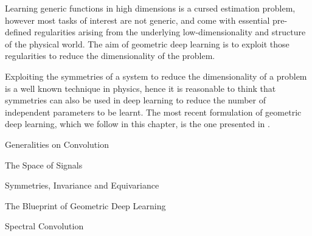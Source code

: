 \documentclass[../main.tex]{subfiles}
\begin{document}
    Learning generic functions in high dimensions is a cursed estimation
    problem, however most tasks of interest are not generic, and come with essential
    pre-defined regularities arising from the underlying low-dimensionality
    and structure of the physical world. 
    The aim of geometric deep learning is to exploit those regularities to reduce the dimensionality of the problem.

    Exploiting the symmetries of a system to reduce the dimensionality of a problem is a well known 
    technique in physics, hence it is reasonable to think that symmetries can also be used in deep learning
    to reduce the number of independent parameters to be learnt.
    The most recent formulation of geometric deep learning, which we follow in this chapter, is the one presented in \cite{2021geo}. 

    \begin{section}{Generalities on Convolution}
        \label{sec:3:1}
           
    \end{section}
    \begin{section}{The Space of Signals}
           
    \end{section}
    \begin{section}{Symmetries, Invariance and Equivariance}
         
        \label{sec:3:3}   
    \end{section}
    \begin{section}{The Blueprint of Geometric Deep Learning}
           
    \end{section}
    \begin{section}{Spectral Convolution}
          
    \end{section}
\end{document}
